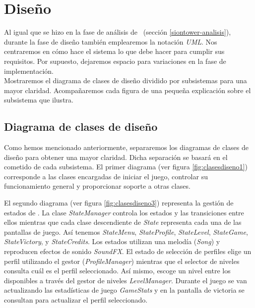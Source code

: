\section{Diseño}
\label{sec:siontower-diseno}

Al igual que se hizo en la fase de análisis de \juego\ (sección
\ref{siontower-analisis}), durante la fase de diseño también emplearemos
la notación \textit{UML}. Nos centraremos en cómo hace el sistema lo que
debe hacer para cumplir sus requisitos. Por supuesto, dejaremos espacio
para variaciones en la fase de implementación.\\

Mostraremos el diagrama de clases de diseño dividido por
subsistemas para una mayor claridad. Acompañaremos cada figura de una pequeña
explicación sobre el subsistema que ilustra.\\

\subsection{Diagrama de clases de diseño}

Como hemos mencionado anteriormente, separaremos los diagramas de clases
de diseño para obtener una mayor claridad. Dicha separación se basará
en el cometido de cada subsistema. El primer diagrama (ver figura
\ref{fig:clasesdiseno1}) corresponde a las clases encargadas de iniciar
el juego, controlar su funcionamiento general y proporcionar soporte a
otras clases.\\


El segundo diagrama (ver figura \ref{fig:clasesdiseno3}) representa la gestión
de estados de \juego. La clase \textit{StateManager} controla los estados
y las transiciones entre ellos mientras que cada clase descendiente de
\textit{State} representa cada una de las pantallas de juego. Así tenemos
\textit{StateMenu}, \textit{StateProfile}, \textit{StateLevel}, \textit{StateGame},
\textit{StateVictory}, y \textit{StateCredits}. Los estados utilizan una
melodía (\textit{Song}) y reproducen efectos de sonido \textit{SoundFX}.
El estado de selección de perfiles elige un perfil utilizando el gestor
(\textit{ProfileManager}) mientras que el selector de niveles consulta
cuál es el perfil seleccionado. Así mismo, escoge un nivel entre los
disponibles a través del gestor de niveles \textit{LevelManager}. Durante
el juego se van actualizando las estadísticas de juego \textit{GameStats}
y en la pantalla de victoria se consultan para actualizar el perfil seleccionado.\\


